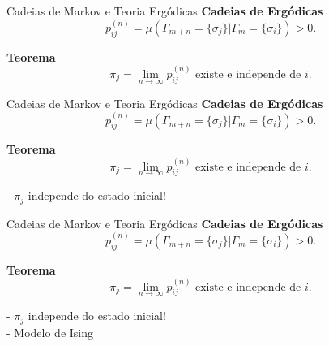 \documentclass[10pt]{beamer}
\begin{document}
\begin{frame}{Cadeias de Markov e Teoria Ergódicas}
	\textbf{Cadeias de Ergódicas}\\
	\begin{equation*}
		p_{ij}^{(n)} = \mu(\Gamma_{m+n} = 	\{ \sigma_j \} \vert \Gamma_m = \{ \sigma_i \}) > 0.	
	\end{equation*}		
	
	\textbf{Teorema}
	\begin{equation*}
		\pi_j = \lim_{n \to \infty} p_{ij}^{(n)} \text{ existe e independe de } i.
	\end{equation*}

\end{frame}


\begin{frame}{Cadeias de Markov e Teoria Ergódicas}
	\textbf{Cadeias de Ergódicas}\\
	\begin{equation*}
		p_{ij}^{(n)} = \mu(\Gamma_{m+n} = 	\{ \sigma_j \} \vert \Gamma_m = \{ \sigma_i \}) > 0.	
	\end{equation*}		
	
	\textbf{Teorema}
	\begin{equation*}
		\pi_j = \lim_{n \to \infty} p_{ij}^{(n)} \text{ existe e independe de } i.
	\end{equation*}

	- $\pi_j$ independe do estado inicial!
\end{frame}


\begin{frame}{Cadeias de Markov e Teoria Ergódicas}
	\textbf{Cadeias de Ergódicas}\\
	\begin{equation*}
		p_{ij}^{(n)} = \mu(\Gamma_{m+n} = 	\{ \sigma_j \} \vert \Gamma_m = \{ \sigma_i \}) > 0.	
	\end{equation*}		
	
	\textbf{Teorema}
	\begin{equation*}
		\pi_j = \lim_{n \to \infty} p_{ij}^{(n)} \text{ existe e independe de } i.
	\end{equation*}

	- $\pi_j$ independe do estado inicial! \\
	- Modelo de Ising
\end{frame}
\end{document}
